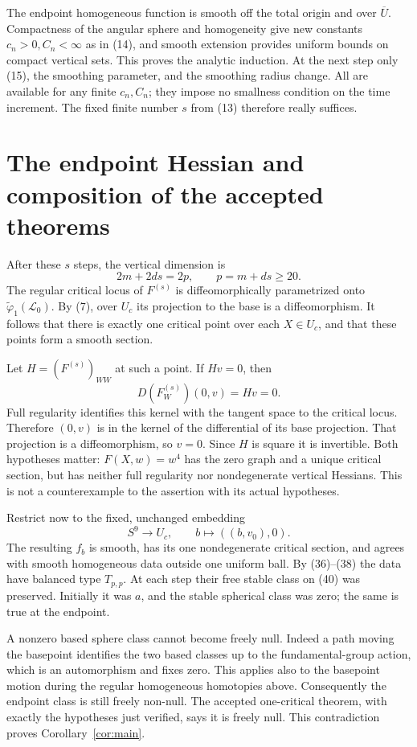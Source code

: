 \documentclass[11pt]{article}
\begin{document}
The endpoint homogeneous function is smooth off the total origin
and over \(\overline U\). Compactness of the angular sphere and
homogeneity give new constants \(c_n>0,C_n<\infty\) as in (14),
and smooth extension provides uniform bounds on compact vertical
sets. This proves the analytic induction.
At the next step only (15), the smoothing parameter, and the
smoothing radius change. All are available for any finite
\(c_n,C_n\); they impose no smallness condition on the time increment.
The fixed finite number \(s\) from (13) therefore really suffices.

\section{The endpoint Hessian and composition of the accepted theorems}

After these \(s\) steps, the vertical dimension is
\[
 2m+2ds=2p,\qquad p=m+ds\geq20.
 \tag{38}
\]
The regular critical locus of \(F^{(s)}\) is diffeomorphically
parametrized onto \(\widetilde\varphi_1(\mathcal L_0)\).
By (7), over \(U_c\) its projection to the base is a diffeomorphism.
It follows that there is exactly one critical point over each
\(X\in U_c\), and that these points form a smooth section.

Let \(H=(F^{(s)})_{WW}\) at such a point. If \(Hv=0\), then
\[
 D(F^{(s)}_W)(0,v)=Hv=0.
 \tag{39}
\]
Full regularity identifies this kernel with the tangent space to
the critical locus. Therefore \((0,v)\) is in the kernel of the
differential of its base projection. That projection is a
diffeomorphism, so \(v=0\). Since \(H\) is square it is invertible.
Both hypotheses matter: \(F(X,w)=w^4\) has the zero graph and a
unique critical section, but has neither full regularity nor
nondegenerate vertical Hessians. This is not a counterexample to
the assertion with its actual hypotheses.

Restrict now to the fixed, unchanged embedding
\[
 S^9\longrightarrow U_c,\qquad b\longmapsto((b,v_0),0).
 \tag{40}
\]
The resulting \(f_b\) is smooth, has its one nondegenerate critical
section, and agrees with smooth homogeneous data outside one
uniform ball. By (36)--(38) the data have balanced type \(T_{p,p}\).
At each step their free stable class on (40) was preserved.
Initially it was \(a\), and the stable spherical class was zero;
the same is true at the endpoint.

A nonzero based sphere class cannot become freely null.
Indeed a path moving the basepoint identifies the two based classes
up to the fundamental-group action, which is an automorphism and
fixes zero. This applies also to the basepoint motion during the
regular homogeneous homotopies above. Consequently the endpoint
class is still freely non-null. The accepted one-critical theorem,
with exactly the hypotheses just verified, says it is freely null.
This contradiction proves Corollary~\ref{cor:main}.
\end{document}

